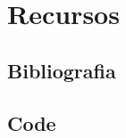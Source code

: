

\newpage



\newpage



\newpage
\section{Recursos}

\subsection{Bibliografia}
\nocite{*}
\printbibliography[heading=none]




\newpage
\begin{appendices}



\newpage
\subsection{Code}

\end{appendices}

